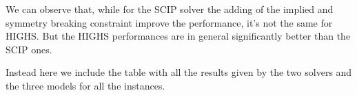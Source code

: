 We can observe that, while for the SCIP solver the adding of the implied and symmetry breaking constraint improve the performance, it's not the same for HIGHS.
But the HIGHS performances are in general significantly better than the SCIP ones.


Instead here we include the table with all the results given by the two solvers and the three models for all the instances.

\begin{table}[H]
        \centering
        \caption{Results of the scip and highs solvers for the three models}
\end{table}
